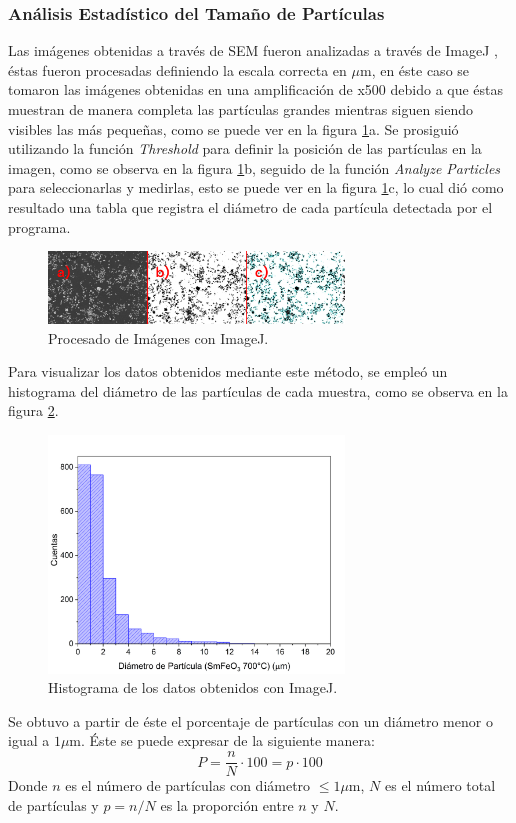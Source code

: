\documentclass[../main.tex]{subfiles}
\begin{document}
\subsubsection{Análisis Estadístico del Tamaño de Partículas} \label{sec:analisisestadistico}
Las imágenes obtenidas a través de SEM fueron analizadas a través de ImageJ \cite{ImageJ}, éstas fueron procesadas definiendo la escala correcta en $\mu$m, en éste caso se tomaron las imágenes obtenidas en una amplificación de x500 debido a que éstas muestran de manera completa las partículas grandes mientras siguen siendo visibles las más pequeñas, como se puede ver en la figura \ref{fig:imgjcomp}a. Se prosiguió utilizando la función \textit{Threshold} para definir la posición de las partículas en la imagen, como se observa en la figura \ref{fig:imgjcomp}b, seguido de la función \textit{Analyze Particles} para seleccionarlas y medirlas, esto se puede ver en la figura \ref{fig:imgjcomp}c, lo cual dió como resultado una tabla que registra el diámetro de cada partícula detectada por el programa.
\begin{figure}[H]
    \centering
    \includegraphics[width=0.7\textwidth]{fig/imagejcomp.png}
    \caption{Procesado de Imágenes con ImageJ.}
    \label{fig:imgjcomp}
\end{figure}
Para visualizar los datos obtenidos mediante este método, se empleó un histograma del diámetro de las partículas de cada muestra, como se observa en la figura \ref{fig:ejemplohist}.
\begin{figure}[H]
    \centering
    \includegraphics[width=0.7\textwidth]{fig/ejemplohist.png}
    \caption{Histograma de los datos obtenidos con ImageJ.}
    \label{fig:ejemplohist}
\end{figure}
Se obtuvo a partir de éste el porcentaje de partículas con un diámetro menor o igual a $1\mu$m. Éste se puede expresar de la siguiente manera:
\begin{equation}
    P=\dfrac{n}{N}\cdot100=p\cdot100
    \label{eq:porcentajeeq}
\end{equation}
Donde $n$ es el número de partículas con diámetro $\leq 1\mu$m, $N$ es el número total de partículas y $p=n/N$ es la proporción entre $n$ y $N$.
\end{document}
